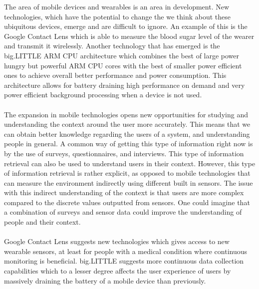 The area of mobile devices and wearables is an area in development. New technologies, which have the potential to change the we think about these ubiquitous devices, emerge and are difficult to ignore. An example of this is the Google Contact Lens \parencite{google_contact_lens} which is able to measure the blood sugar level of the wearer and transmit it wirelessly. Another technology that has emerged is the big.LITTLE ARM CPU architecture \parencite{big_little_architecture} which combines the best of large power hungry but powerful ARM CPU cores with the best of smaller power efficient ones to achieve overall better performance and power consumption. This architecture allows for battery draining high performance on demand and very power efficient background processing when a device is not used. 
\\\\
The expansion in mobile technologies opens new opportunities for studying and understanding the context around the user more accurately. This means that we can obtain better knowledge regarding the users of a system, and understanding people in general. A common way of getting this type of information right now is by the use of surveys, questionnaires, and interviews. This type of information retrieval can also be used to understand users in their context. However, this type of information retrieval is rather explicit, as opposed to mobile technologies that can measure the environment indirectly using different built in sensors. The issue with this indirect understanding of the context is that users are more complex compared to the discrete values outputted from sensors. One could imagine that a combination of surveys and sensor data could improve the understanding of people and their context. 
\\\\
Google Contact Lens suggests new technologies which gives access to new wearable sensors, at least for people with a medical condition where continuous monitoring is beneficial. big.LITTLE suggests more continuous data collection capabilities which to a lesser degree affects the user experience of users by massively draining the battery of a mobile device than previously. 
\\\
